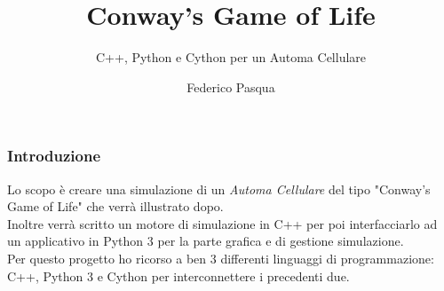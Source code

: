 \documentclass[11pt]{beamer}
\begin{document}
	\author{Federico Pasqua}
	\title{Conway's Game of Life}
	\subtitle{C++, Python e Cython per un Automa Cellulare}
	\begin{frame}[plain]
	\maketitle
\end{frame}

\begin{frame}
\frametitle{Introduzione}
Lo scopo è creare una simulazione di un \emph{Automa Cellulare} del tipo "Conway's Game of Life" che verrà illustrato dopo.\\
Inoltre verrà scritto un motore di simulazione in C++ per poi interfacciarlo ad un applicativo in Python 3 per la parte grafica e di gestione simulazione.\\
Per questo progetto ho ricorso a ben 3 differenti linguaggi di programmazione: C++, Python 3 e Cython per interconnettere i precedenti due.
\end{frame}
\end{document}
